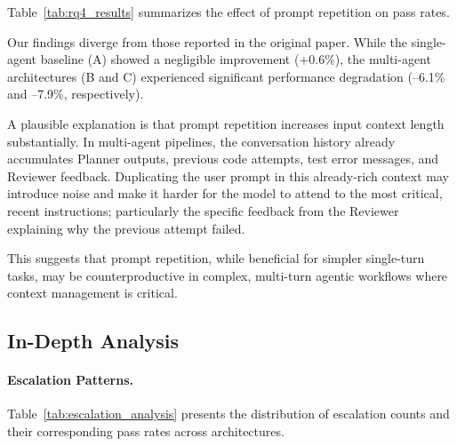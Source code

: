 Table~\ref{tab:rq4_results} summarizes the effect of prompt repetition on pass rates.

\begin{table}[ht]
    \centering
    \caption{Effect of Prompt Repetition on Pass Rates.}
    \label{tab:rq4_results}
\end{table}

Our findings diverge from those reported in the original paper. While the single-agent baseline (A) showed a negligible improvement (+0.6\%), the multi-agent architectures (B and C) experienced significant performance degradation (--6.1\% and --7.9\%, respectively).

A plausible explanation is that prompt repetition increases input context length substantially. In multi-agent pipelines, the conversation history already accumulates Planner outputs, previous code attempts, test error messages, and Reviewer feedback. Duplicating the user prompt in this already-rich context may introduce noise and make it harder for the model to attend to the most critical, recent instructions; particularly the specific feedback from the Reviewer explaining why the previous attempt failed.

This suggests that prompt repetition, while beneficial for simpler single-turn tasks, may be counterproductive in complex, multi-turn agentic workflows where context management is critical.

\subsection{In-Depth Analysis}
\label{subsec:indepth}

\paragraph{Escalation Patterns.}
Table~\ref{tab:escalation_analysis} presents the distribution of escalation counts and their corresponding pass rates across architectures.

